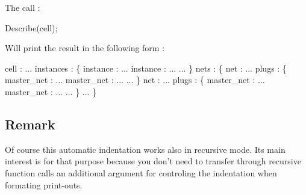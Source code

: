  The call \-: 
\begin{DoxyCode}
Describe(cell);
\end{DoxyCode}
 Will print the result in the following form \-: 
\begin{DoxyCode}
cell : ...
   instances : \{
      instance : ...
      instance : ...
      ...
   \}
   nets : \{
      net : ...
         plugs : \{
            master\_net : ...
            master\_net : ...
            ...
         \}
      net : ...
         plugs : \{
            master\_net : ...
            master\_net : ...
            ...
         \}
      ...
   \}
\end{DoxyCode}
\hypertarget{classHurricane_1_1Tabulation_secTabulationRemark}{}\subsection{Remark}\label{classHurricane_1_1Tabulation_secTabulationRemark}
Of course this automatic indentation works also in recursive mode. Its main interest is for that purpose because you don't need to transfer through recursive function calls an additional argument for controling the indentation when formating print-\/outs. 

